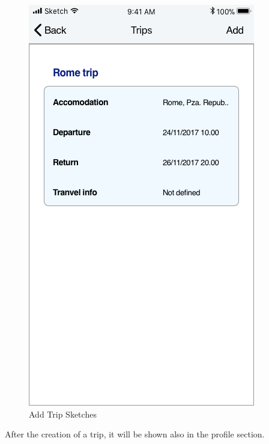\begin{figure}[H]
	\hspace{0.5cm}
	\includegraphics[scale=0.23]{Images/Interface/Trips/4_trips_list}
	\caption{Add Trip Sketches}
\end{figure}
After the creation of a trip, it will be shown also in the profile section.
